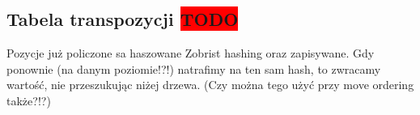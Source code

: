 \subsection{Tabela transpozycji \colorbox{red}{TODO}}
\label{subsec:tabela-transpozycji}

{
    \color{red}
    \large Pozycje już policzone sa haszowane Zobrist hashing oraz zapisywane.
    Gdy ponownie (na danym poziomie!?!) natrafimy na ten sam hash, to zwracamy wartość, nie przeszukując niżej drzewa.
    (Czy można tego użyć przy move ordering także?!?)
}